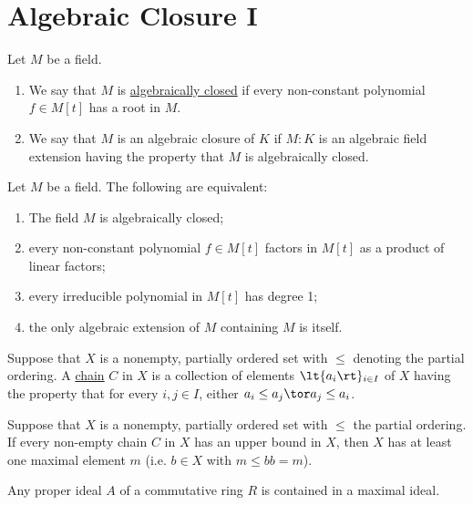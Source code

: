 \documentclass[a4paper]{article}
\begin{document}
\section{Algebraic Closure I}
\begin{tdefinition}
  Let \( M \) be a field. \begin{enumerate}[label=(\roman*)]
    \item We say that \( M \) is \ul{algebraically closed} if every non-constant polynomial \( f\in M[t] \) has a root in \( M \).
    \item We say that \( M \) is an algebraic closure of \( K \) if \( M:K \) is an algebraic field extension having the property that \( M \) is algebraically closed.
  \end{enumerate}
\end{tdefinition}

\begin{tlemma}
  Let \( M \) be a field.
  The following are equivalent: \begin{enumerate}[label=(\roman*)]
    \item The field \( M \) is algebraically closed;
    \item every non-constant polynomial \( f\in M[t] \) factors in \( M[t] \) as a product of linear factors;
    \item every irreducible polynomial in \( M[t] \) has degree 1;
    \item the only algebraic extension of \( M \) containing \( M \) is itself.
  \end{enumerate}
\end{tlemma}

\begin{tdefinition}[Chain]
  Suppose that \( X \) is a nonempty, partially ordered set with \( \leq \) denoting the partial ordering.
  A \ul{chain} \( C \) in \( X \) is a collection of elements \( \lt\{ a_i \rt\}_{i\in I} \) of \( X \) having the property that for every \( i,j\in I \), either \( a_i\leq a_j \tor a_j\leq a_i \).
\end{tdefinition}

\quad Suppose that \( X \) is a nonempty, partially ordered set with \( \leq \) the partial ordering.
If every non-empty chain \( C \) in \( X \) has an upper bound in \( X \), then \( X \) has at least one maximal element \( m \) (i.e. \( b\in X \) with \( m\leq b \)\imp\( b=m \)).

\begin{tcorollary}
  Any proper ideal \( A \) of a commutative ring \( R \) is contained in a maximal ideal.
\end{tcorollary}
\end{document}
